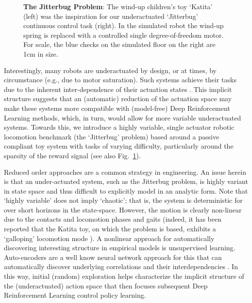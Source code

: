 \documentclass[letterpaper, 10 pt, conference]{ieeeconf}
\begin{document}
\begin{figure}[ht]
    \caption{
        \textbf{The Jitterbug Problem}: The wind-up children's toy `Katita' (left) was the inspiration for our underactuated `Jitterbug' continuous control task (right).
        In the simulated robot the wind-up spring is replaced with a controlled single degree-of-freedom motor.
        For scale, the blue checks on the simulated floor on the right are 1cm in size.
    }
    \label{fig:leader}
    
\end{figure} 

Interestingly, many robots are underactuated by design, or at times, by circumstance (e.g., due to motor saturation).
Such systems achieve their tasks due to the inherent inter-dependence of their actuation states \cite{spong1998underactuated}.
This implicit structure suggests that an (automatic) reduction of the actuation space may make these systems more compatible with (model-free) Deep Reinforcement Learning methods, which, in turn, would allow for more variable underactuated systems.
Towards this, we introduce a highly variable, single actuator robotic locomotion benchmark (the `Jitterbug' problem) based around a passive compliant toy system with tasks of varying difficulty, particularly around the sparsity of the reward signal (see also Fig.~\ref{fig:leader}).

Reduced order approaches are a common strategy in engineering.
An issue herein is that an under-actuated system, such as the Jitterbug problem, is highly variant in state space and thus difficult to explicitly model in an analytic form.
Note that `highly variable' does not imply `chaotic'; that is, the system is deterministic for over short horizons in the state-space.
However, the motion is clearly non-linear due to the contacts and locomotion phases and gaits (indeed, it has been reported that the Katita toy, on which the problem is based, exhibits a `galloping' locomotion mode \cite{jgn.thesis}).
A nonlinear approach for automatically discovering interesting structure in empirical models is unsupervised learning.
Auto-encoders are a well know neural network approach for this that can automatically discover underlying correlations and their interdependencies \cite{AE_hinton2006reducing}.
In this way, initial (random) exploration helps characterize the implicit structure of the (underactuated) action space that then focuses subsequent Deep Reinforcement Learning control policy learning.
\end{document}
